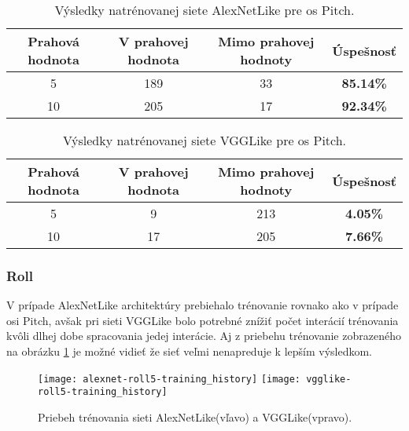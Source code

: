 \begin{table}[H]
    \centering
    \begin{tabular}{|c|c|c|c|}
        \hline
        Prahová hodnota & V prahovej hodnota       & Mimo prahovej hodnoty    & Úspešnosť    \\ \hline
        5               & {\color[HTML]{009901} 189} & {\color[HTML]{9A0000} 33} & \textbf{85.14\%} \\ \hline
        10              & {\color[HTML]{009901} 205} & {\color[HTML]{9A0000} 17} & \textbf{92.34\%} \\ \hline
    \end{tabular}
    \caption{Výsledky natrénovanej siete AlexNetLike pre os Pitch.}
    \label{tab:alexnetpitchresults}
\end{table}
\begin{table}[H]
    \centering
    \begin{tabular}{|c|c|c|c|}
        \hline
        Prahová hodnota & V prahovej hodnota       & Mimo prahovej hodnoty    & Úspešnosť    \\ \hline
        5               & {\color[HTML]{009901} 9} & {\color[HTML]{9A0000} 213} & \textbf{4.05\%} \\ \hline
        10              & {\color[HTML]{009901} 17} & {\color[HTML]{9A0000} 205} & \textbf{7.66\%} \\ \hline
    \end{tabular}
    \caption{Výsledky natrénovanej siete VGGLike pre os Pitch.}
    \label{tab:vgglikepitchresults}
\end{table}


\subsubsection{Roll}
V prípade AlexNetLike architektúry prebiehalo trénovanie rovnako ako v prípade osi Pitch,
    avšak pri sieti VGGLike bolo potrebné znížiť počet interácií trénovania kvôli dlhej dobe
    spracovania jedej interácie.
Aj z priebehu trénovanie zobrazeného na obrázku \ref{pic:rollaxis} je možné vidieť že sieť veľmi nenapreduje k lepším výsledkom.

\begin{figure}[H]
    \centering
    \texttt{[image: alexnet-roll5-training\_history]}
	\texttt{[image: vgglike-roll5-training\_history]}
	\caption{Priebeh trénovania sieti AlexNetLike(vľavo) a VGGLike(vpravo).}
	\label{pic:rollaxis}
\end{figure}

